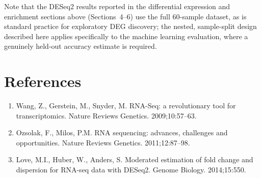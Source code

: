 \documentclass[12pt]{article}
\begin{document}
Note that the DESeq2 results reported in the differential expression and
enrichment sections above (Sections~4--6) use the full 60-sample dataset, as
is standard practice for exploratory DEG discovery; the nested, sample-split
design described here applies specifically to the machine learning
evaluation, where a genuinely held-out accuracy estimate is required.

\section*{References}
\begin{enumerate}
  \item Wang, Z., Gerstein, M., Snyder, M. RNA-Seq: a revolutionary tool for
  transcriptomics. Nature Reviews Genetics. 2009;10:57--63.
  \item Ozsolak, F., Milos, P.M. RNA sequencing: advances, challenges and
  opportunities. Nature Reviews Genetics. 2011;12:87--98.
  \item Love, M.I., Huber, W., Anders, S. Moderated estimation of fold change
  and dispersion for RNA-seq data with DESeq2. Genome Biology.
  2014;15:550.
\end{enumerate}
\end{document}
